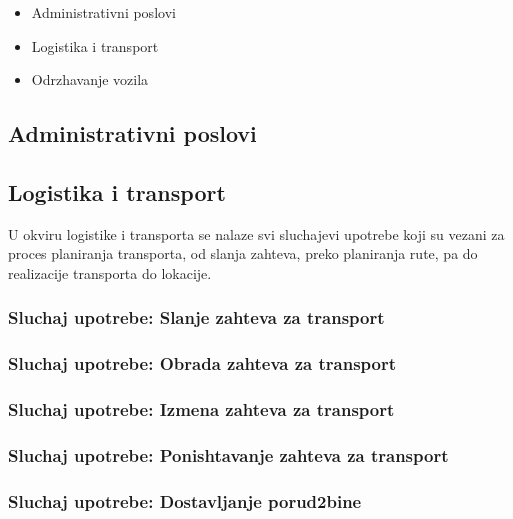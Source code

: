 \documentclass{article}
\begin{document}
\begin{itemize}
    \item Administrativni poslovi
    \item Logistika i transport
    \item Odrzhavanje vozila
\end{itemize}

\subsection{Administrativni poslovi}



\subsection{Logistika i transport}
U okviru logistike i transporta se nalaze svi sluchajevi upotrebe koji su vezani za proces planiranja transporta, od slanja zahteva, preko planiranja rute, pa do realizacije transporta do lokacije.
     
\subsubsection{Sluchaj upotrebe: Slanje zahteva za transport}


\subsubsection{Sluchaj upotrebe: Obrada zahteva za transport}


\subsubsection{Sluchaj upotrebe: Izmena zahteva za transport}


\subsubsection{Sluchaj upotrebe: Ponishtavanje zahteva za transport}


\subsubsection{Sluchaj upotrebe: Dostavljanje porud2bine}

\end{document}
